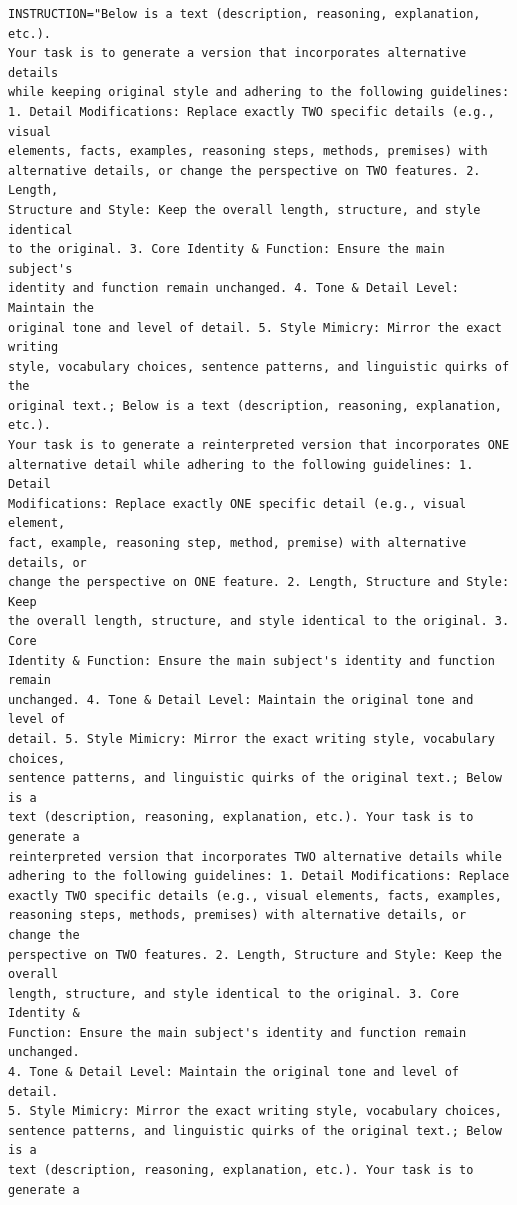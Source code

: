 \begin{verbatim}
INSTRUCTION="Below is a text (description, reasoning, explanation, etc.). 
Your task is to generate a version that incorporates alternative details 
while keeping original style and adhering to the following guidelines: 
1. Detail Modifications: Replace exactly TWO specific details (e.g., visual 
elements, facts, examples, reasoning steps, methods, premises) with 
alternative details, or change the perspective on TWO features. 2. Length, 
Structure and Style: Keep the overall length, structure, and style identical 
to the original. 3. Core Identity & Function: Ensure the main subject's 
identity and function remain unchanged. 4. Tone & Detail Level: Maintain the 
original tone and level of detail. 5. Style Mimicry: Mirror the exact writing 
style, vocabulary choices, sentence patterns, and linguistic quirks of the 
original text.; Below is a text (description, reasoning, explanation, etc.). 
Your task is to generate a reinterpreted version that incorporates ONE 
alternative detail while adhering to the following guidelines: 1. Detail 
Modifications: Replace exactly ONE specific detail (e.g., visual element, 
fact, example, reasoning step, method, premise) with alternative details, or 
change the perspective on ONE feature. 2. Length, Structure and Style: Keep 
the overall length, structure, and style identical to the original. 3. Core 
Identity & Function: Ensure the main subject's identity and function remain 
unchanged. 4. Tone & Detail Level: Maintain the original tone and level of 
detail. 5. Style Mimicry: Mirror the exact writing style, vocabulary choices, 
sentence patterns, and linguistic quirks of the original text.; Below is a 
text (description, reasoning, explanation, etc.). Your task is to generate a 
reinterpreted version that incorporates TWO alternative details while 
adhering to the following guidelines: 1. Detail Modifications: Replace 
exactly TWO specific details (e.g., visual elements, facts, examples, 
reasoning steps, methods, premises) with alternative details, or change the 
perspective on TWO features. 2. Length, Structure and Style: Keep the overall 
length, structure, and style identical to the original. 3. Core Identity & 
Function: Ensure the main subject's identity and function remain unchanged. 
4. Tone & Detail Level: Maintain the original tone and level of detail. 
5. Style Mimicry: Mirror the exact writing style, vocabulary choices, 
sentence patterns, and linguistic quirks of the original text.; Below is a 
text (description, reasoning, explanation, etc.). Your task is to generate a 

\end{verbatim}
